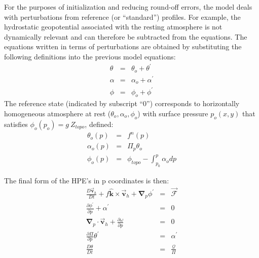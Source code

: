 For the purposes of initialization and reducing round-off errors, the model
deals with perturbations from reference (or ``standard'') profiles. For
example, the hydrostatic geopotential associated with the resting atmosphere
is not dynamically relevant and can therefore be subtracted from the
equations. The equations written in terms of perturbations are obtained by
substituting the following definitions into the previous model equations: 
\begin{eqnarray}
\theta &=&\theta _{o}+\theta ^{\prime }  \label{eq:atmos-ref-prof-theta} \\
\alpha &=&\alpha _{o}+\alpha ^{\prime }  \label{eq:atmos-ref-prof-alpha} \\
\phi &=&\phi _{o}+\phi ^{\prime }  \label{eq:atmos-ref-prof-phi}
\end{eqnarray}
The reference state (indicated by subscript ``0'') corresponds to
horizontally homogeneous atmosphere at rest ($\theta _{o},\alpha _{o},\phi
_{o}$) with surface pressure $p_{o}(x,y)$ that satisfies $\phi
_{o}(p_{o})=g~Z_{topo}$, defined: 
\begin{eqnarray*}
\theta _{o}(p) &=&f^{n}(p) \\
\alpha _{o}(p) &=&\Pi _{p}\theta _{o} \\
\phi _{o}(p) &=&\phi _{topo}-\int_{p_{0}}^{p}\alpha _{o}dp
\end{eqnarray*}

The final form of the HPE's in p coordinates is then: 
\begin{eqnarray}
\frac{D\vec{\mathbf{v}}_{h}}{Dt}+f\hat{\mathbf{k}}\times \vec{\mathbf{v}}
_{h}+\mathbf{\nabla }_{p}\phi ^{\prime } &=&\vec{\mathbf{\mathcal{F}}} \label{eq:atmos-prime} \\
\frac{\partial \phi ^{\prime }}{\partial p}+\alpha ^{\prime } &=&0 \\
\mathbf{\nabla }_{p}\cdot \vec{\mathbf{v}}_{h}+\frac{\partial \omega }{
\partial p} &=&0 \\
\frac{\partial \Pi }{\partial p}\theta ^{\prime } &=&\alpha ^{\prime } \\
\frac{D\theta }{Dt} &=&\frac{\mathcal{Q}}{\Pi } 
\end{eqnarray}


